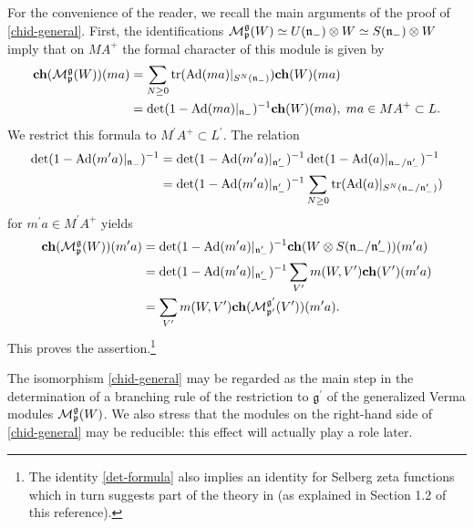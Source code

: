 \documentclass[a4paper,12pt,reqno]{amsart}
\numberwithin{theorem}{subsection}
\numberwithin{equation}{section}
\begin{document}
For the convenience of the reader, we recall the main arguments of the proof of
\eqref{chid-general}. First, the identifications ${\fam2 M}^{{\mathfrak g}}_{{\mathfrak p}} (W)
\simeq U({{\mathfrak n}}_-) \otimes W \simeq S({{\mathfrak n}}_-) \otimes W$ imply that on $MA^+$ the
formal character of this module is given by
\begin{align*}
   {{\bf ch}}({\fam2 M}^{{\mathfrak g}}_{{\mathfrak p}} (W))(ma) & = \sum_{N \ge 0} {\operatorname{tr}}({\operatorname{Ad}}(ma)|_{S^N({{\mathfrak n}}_-)}) {{\bf ch}}(W)(ma)\\
   & = \det(1-{\operatorname{Ad}}(ma)|_{{{\mathfrak n}}_-})^{-1} {{\bf ch}}(W)(ma), \; ma \in MA^+ \subset L.
\end{align*}
We restrict this formula to $M^\prime A^+ \subset L^\prime$. The relation
\begin{align}\label{det-formula}
   \det(1-{\operatorname{Ad}}(m'a)|_{{{\mathfrak n}}_-})^{-1} & = \det(1-{\operatorname{Ad}}(m'a)|_{{{\mathfrak n}}_-^\prime})^{-1}
   \det(1-{\operatorname{Ad}}(a)|_{{{\mathfrak n}}_-/{{\mathfrak n}}^\prime_-})^{-1} \notag \\
   & = \det(1-{\operatorname{Ad}}(m'a)|_{{{\mathfrak n}}_-^\prime})^{-1}
   \sum_{N \ge 0} {\operatorname{tr}} ({\operatorname{Ad}}(a)|_{S^N({{\mathfrak n}}_-/{{\mathfrak n}}^\prime_-)})
\end{align}
for $m^\prime a \in M^\prime A^+$ yields
\begin{align*}
   {{\bf ch}}({\fam2 M}^{{\mathfrak g}}_{{\mathfrak p}} (W))(m^\prime a) & = \det(1-{\operatorname{Ad}}(m'a)|_{{{\mathfrak n}}_-^\prime})^{-1}
   {{\bf ch}}(W \otimes S({{\mathfrak n}}_-/{{\mathfrak n}}^\prime_-))(m^\prime a) \\
   & = \det(1-{\operatorname{Ad}}(m'a)|_{{{\mathfrak n}}_-^\prime})^{-1} \sum_{V^\prime} m(W,V^\prime)
   {{\bf ch}}(V^\prime)(m^\prime a) \\
   & = \sum_{V^\prime} m(W,V^{\prime}) {{\bf ch}}({\fam2 M}^{{{\mathfrak g}}^\prime}_{{{\mathfrak p}}^\prime}
   (V^\prime))(m^\prime a).
\end{align*}
This proves the assertion.\footnote{The identity \eqref{det-formula} also
implies an identity for Selberg zeta functions which in turn suggests part of
the theory in \cite{Juhl} (as explained in Section 1.2 of this reference).}

The isomorphism \eqref{chid-general} may be regarded as the main step in the
determination of a branching rule of the restriction to ${{\mathfrak g}}^\prime$ of the
generalized Verma modules ${\fam2 M}^{{\mathfrak g}}_{{\mathfrak p}} (W)$. We also stress that the
modules on the right-hand side of \eqref{chid-general} may be reducible: this
effect will actually play a role later.
\end{document}
